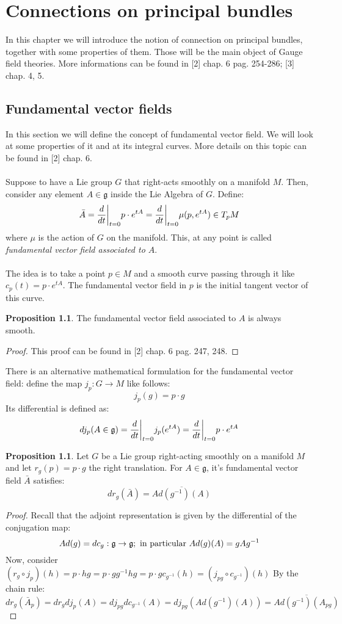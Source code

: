 \documentclass[12pt,a4paper]{report}
\theoremstyle{definition}
\theoremstyle{Theorem}
\newtheorem{Prop}[Def]{Proposition}
\theoremstyle{definition}
\theoremstyle{definition}
\begin{document}
	\chapter{Connections on principal bundles}
	In this chapter we will introduce the notion of connection on principal bundles, together with some properties of them. Those will be the main object of Gauge field theories. More informations can be found in [2] chap. 6 pag. 254-286; [3] chap. 4, 5.
	\section{Fundamental vector fields}
	In this section we will define the concept of fundamental vector field. We will look at some properties of it and at its integral curves. More details on this topic can be found in [2] chap. 6.\\
	\\
	Suppose to have a Lie group $G$ that right-acts smoothly on a manifold $M$. Then, consider any element $A\in\mathfrak{g}$ inside the Lie Algebra of $G$. Define:
	$$\bar{A}={d\over dt}\bigg|_{t=0}p\cdot e^{tA}={d\over dt}\bigg|_{t=0}\mu(p, e^{tA})\in T_pM$$
	where $\mu$ is the action of $G$ on the manifold.
	This, at any point is called \textit{fundamental vector field associated to $A$}.\\
	\\
	The idea is to take a point $p\in M$ and a smooth curve passing through it like $c_p(t)=p\cdot e^{tA}$. The fundamental vector field in $p$ is the initial tangent vector of this curve.
	\begin{Prop}\label{Prop_5.1.2}
		The fundamental vector field associated to $A$ is always smooth.
	\end{Prop}
	\begin{proof}
		This proof can be found in [2] chap. 6 pag. 247, 248.
	\end{proof}
	There is an alternative mathematical formulation for the fundamental vector field: define the map $j_p:G\rightarrow M$ like follows:
	$$j_p(g)=p\cdot g$$
	Its differential is defined as:
	$$dj_p(A\in\mathfrak{g})={d\over dt}\bigg|_{t=0}j_p(e^{tA})={d\over dt}\bigg|_{t=0}p\cdot e^{tA}$$
	\begin{Prop}\label{Prop_5.1.1}
		Let $G$ be a Lie group right-acting smoothly on a manifold $M$ and let $r_g(p)=p\cdot g$ the right translation. For $A\in\mathfrak{g}$, it's fundamental vector field $\bar{A}$ satisfies:
		$$dr_g(\bar{A})=\overline{Ad(g^{-1})(A)}$$
	\end{Prop}
	\begin{proof}
		Recall that the adjoint representation is given by the differential of the conjugation map:
		$$Ad(g)=dc_g:\mathfrak{g}\rightarrow\mathfrak{g};\hbox{ in particular }Ad(g)(A)=gAg^{-1}$$
		Now, consider $(r_g\circ j_p)(h)=p\cdot hg=p\cdot gg^{-1}hg=p\cdot g c_{g^{-1}}(h)=(j_{pg}\circ c_{g^{-1}})(h)$
		By the chain rule:
		$$dr_g(\bar{A}_p)=dr_gdj_p(A)=dj_{pg}dc_{g^{-1}}(A)=dj_{pg}(Ad(g^{-1})(A))=\overline{Ad(g^{-1})(A_{pg})}$$
	\end{proof}
\end{document}
